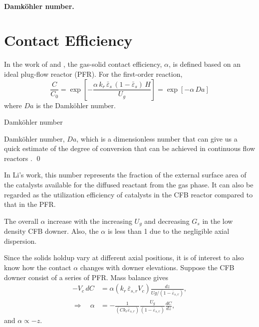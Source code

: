 \paragraph{Damköhler number. }




\newpage
%

\section{Contact Efficiency}
In the work of \citet{li2011catalytic} and \citet{li2013catalytic}, the gas-solid contact efficiency, $\alpha$, is defined based on an ideal plug-flow reactor (PFR).
For the first-order reaction,
\begin{equation}
    \frac{C}{C_0}
    = \exp\left[
        -\frac{\alpha\,k_r\,\bar{\varepsilon}_s\, (1-\bar{\varepsilon}_s)\,H}{U_g}
        \right]
    = \exp\left[ -\alpha\,Da \right]
\end{equation}
where $Da$ is the Damköhler number.

\begin{definition}
    Damköhler number

    Damköhler number, $Da$, which is a dimensionless number that can give us a quick estimate of the degree of conversion that can be achieved in continuous flow reactors \citep{fogler2016element}.
    \qed
\end{definition}

In Li's work, this number represents the fraction of the external surface area of the catalysts available for the diffused reactant from the gas phase.
It can also be regarded as the utilization efficiency of catalysts in the CFB reactor compared to that in the PFR.

The overall $\alpha$ increase with the increasing $U_g$ and decreasing $G_s$ in the low density CFB downer.
Also, the $\alpha$ is less than 1 due to the negligible axial dispersion.

Since the solids holdup vary at different axial positions, it is of interest to also know how the contact $\alpha$ changes with downer elevations.
Suppose the CFB downer consist of a series of PFR.
Mass balance gives
\begin{align}
    -V_c \, dC
           & = \alpha(k_r\, \bar{\varepsilon}_{s,r} V_c) \frac{dz}{Ug/(1-\bar{\varepsilon}_{s,r})}, \\
    \Longrightarrow \quad
    \alpha & = -
    \frac{1}{(C k_r \bar{\varepsilon}_{s,r})}
    \frac{U_g}{(1-\bar{\varepsilon}_{s,r})}
    \frac{dC}{dz},
\end{align}
and $\alpha \propto - z$.
